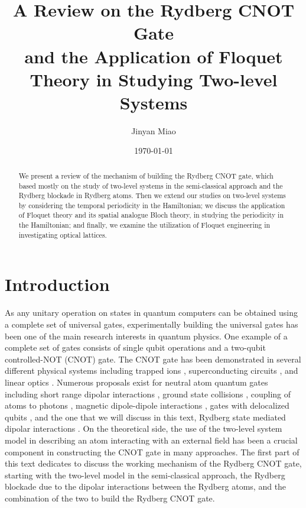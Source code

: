 \documentclass[reprint, amsmath, amssymb, aps]{revtex4-2}
\begin{document}
\title{A Review on the Rydberg CNOT Gate \\and the Application of Floquet Theory in Studying Two-level Systems}

\author{Jinyan Miao}
\hfill\break
\date{\today}


\begin{abstract}
We present a review of the mechanism of building the Rydberg CNOT gate, which based mostly on the study of two-level systems in the semi-classical approach and the Rydberg blockade in Rydberg atoms. Then we extend our studies on two-level systems by considering the temporal periodicity in the Hamiltonian; we discuss the application of Floquet theory and its spatial analogue Bloch theory, in studying the periodicity in the Hamiltonian; and finally, we examine the utilization of Floquet engineering in investigating optical lattices.
\end{abstract}

\maketitle

\section{\label{sec:level1}Introduction}
As any unitary operation on states in quantum computers can be obtained using a complete set of universal gates, experimentally building the universal gates has been one of the main research interests in quantum physics. One example of a complete set of gates consists of single qubit operations and a two-qubit controlled-NOT (CNOT) gate. The CNOT gate has been demonstrated in
several different physical systems including trapped ions \cite{2, 3}, superconducting circuits \cite{4,5}, and linear optics \cite{6,7}. Numerous proposals exist for neutral atom quantum
gates including short range dipolar interactions \cite{8}, ground state collisions \cite{9}, coupling of atoms to photons \cite{10}, magnetic dipole-dipole interactions \cite{11}, gates with delocalized qubits \cite{12}, and the one that we will discuss in this text, Rydberg state mediated dipolar interactions \cite{13, Isenhower, IsenhowerThesis}. On the theoretical side, the use of the two-level system model in describing an atom interacting with an external field has been a crucial component in constructing the CNOT gate in many approaches. The first part of this text dedicates to discuss the working mechanism of the Rydberg CNOT gate, starting with the two-level model in the semi-classical approach, the Rydberg blockade due to the dipolar interactions between the Rydberg atoms, and the combination of the two to build the Rydberg CNOT gate. \\
\end{document}
